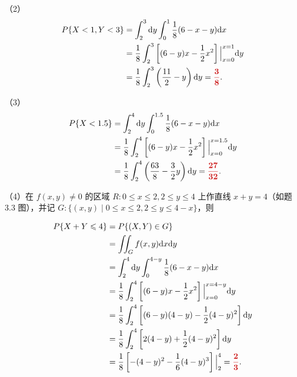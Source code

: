 \documentclass[11pt, UTF8]{ctexart}
\newcommand{\ans}[1]{\mathbf{\color{fred}#1}}
\begin{document}
（2）
\begin{align*}
P\{X < 1, Y < 3\} &= \int_{2}^{3} \mathrm{d}y \int_{0}^{1} \frac{1}{8}(6 - x - y)\mathrm{d}x \\
&= \frac{1}{8} \int_{2}^{3} \left[ (6 - y)x - \frac{1}{2}x^2 \right]\Big|_{x=0}^{x=1} \mathrm{d}y \\
&= \frac{1}{8} \int_{2}^{3} \left( \frac{11}{2} - y \right)\mathrm{d}y = \ans{\frac{3}{8}}.
\end{align*}

（3）
\begin{align*}
P\{X < 1.5\} &= \int_{2}^{4} \mathrm{d}y \int_{0}^{1.5} \frac{1}{8}(6 - x - y)\mathrm{d}x \\
&= \frac{1}{8} \int_{2}^{4} \left[ (6 - y)x - \frac{1}{2}x^2 \right]\Big|_{x=0}^{x=1.5} \mathrm{d}y \\
&= \frac{1}{8} \int_{2}^{4} \left( \frac{63}{8} - \frac{3}{2}y \right)\mathrm{d}y = \ans{\frac{27}{32}}.
\end{align*}

（4）在 $f(x, y) \neq 0$ 的区域 $R: 0 \leqslant x \leqslant 2, 2 \leqslant y \leqslant 4$ 上作直线 $x + y = 4$（如题 3.3 图），并记 $G: \{(x, y) \mid 0 \leqslant x \leqslant 2, 2 \leqslant y \leqslant 4 - x\}$，则

\noindent
\begin{minipage}{0.68\textwidth}
\begin{align*}
P\{X + Y \leqslant 4\} &= P\{(X, Y) \in G\} \\
&= \iint_{G} f(x, y)\mathrm{d}x\mathrm{d}y \\
&= \int_{2}^{4} \mathrm{d}y \int_{0}^{4-y} \frac{1}{8}(6 - x - y)\mathrm{d}x \\
&= \frac{1}{8} \int_{2}^{4} \left[ (6 - y)x - \frac{1}{2}x^2 \right]\Big|_{x=0}^{x=4-y} \mathrm{d}y \\
&= \frac{1}{8} \int_{2}^{4} \left[ (6 - y)(4 - y) - \frac{1}{2}(4 - y)^2 \right]\mathrm{d}y \\
&= \frac{1}{8} \int_{2}^{4} \left[ 2(4 - y) + \frac{1}{2}(4 - y)^2 \right]\mathrm{d}y \\
&= \frac{1}{8} \left[ -(4 - y)^2 - \frac{1}{6}(4 - y)^3 \right]\Big|_{2}^{4} = \ans{\frac{2}{3}}.
\end{align*}
\end{minipage}
\hfill
\begin{minipage}{0.28\textwidth}
\centering
{}
\end{minipage}
\end{document}
